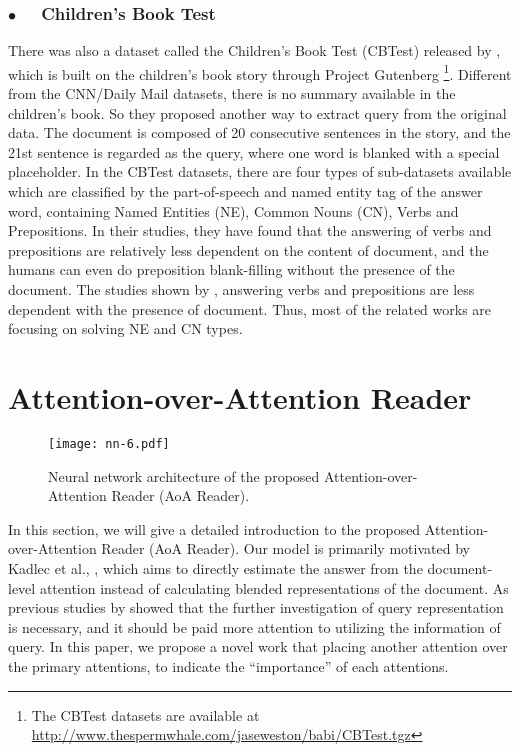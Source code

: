 \documentclass[11pt,a4paper]{article}
\begin{document}
\subsubsection*{$\bullet$~~ Children's Book Test}
There was also a dataset called the Children's Book Test (CBTest) released by , which is built on the children's book story through Project Gutenberg \footnote{The CBTest datasets are available at \url{http://www.thespermwhale.com/jaseweston/babi/CBTest.tgz}}. 
Different from the CNN/Daily Mail datasets, there is no summary available in the children's book. So they proposed another way to extract query from the original data.
The document is composed of 20 consecutive sentences in the story, and the 21st sentence is regarded as the query, where one word is blanked with a special placeholder.
In the CBTest datasets, there are four types of sub-datasets available which are classified by the part-of-speech and named entity tag of the answer word, containing Named Entities (NE), Common Nouns (CN), Verbs and Prepositions. 
In their studies, they have found that the answering of verbs and prepositions are relatively less dependent on the content of document, and the humans can even do preposition blank-filling without the presence of the document.
The studies shown by , answering verbs and prepositions are less dependent with the presence of document. Thus, most of the related works are focusing on solving NE and CN types.

\section{Attention-over-Attention Reader}\label{nn-for-rc}

\begin{figure*}[htbp]
  \centering
  \texttt{[image: nn-6.pdf]}
  \caption{\label{nn-arch} Neural network architecture of the proposed Attention-over-Attention Reader (AoA Reader).}
\end{figure*}

In this section, we will give a detailed introduction to the proposed Attention-over-Attention Reader (AoA Reader).
Our model is primarily motivated by Kadlec et al., , which aims to directly estimate the answer from the document-level attention instead of calculating blended representations of the document. 
As previous studies by  showed that the further investigation of query representation is necessary, and it should be paid more attention to utilizing the information of query.
In this paper, we propose a novel work that placing another attention over the primary attentions, to indicate the ``importance'' of each attentions.
\end{document}
